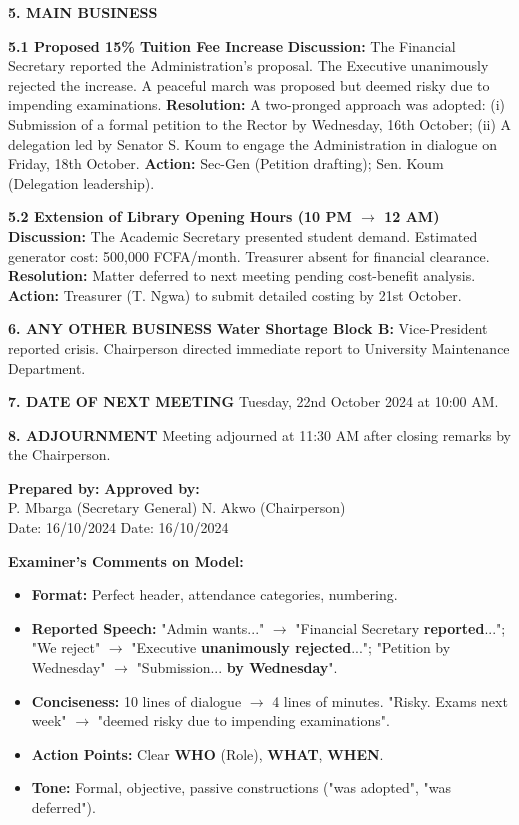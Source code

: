 \documentclass[11pt]{article}
\begin{document}
\begin{exoresolu}
\textbf{5. MAIN BUSINESS}

\textbf{5.1 Proposed 15\% Tuition Fee Increase}
\textbf{Discussion:} The Financial Secretary reported the Administration's proposal. The Executive unanimously rejected the increase. A peaceful march was proposed but deemed risky due to impending examinations.
\textbf{Resolution:} A two-pronged approach was adopted: (i) Submission of a formal petition to the Rector by Wednesday, 16th October; (ii) A delegation led by Senator S. Koum to engage the Administration in dialogue on Friday, 18th October.
\textbf{Action:} Sec-Gen (Petition drafting); Sen. Koum (Delegation leadership).

\textbf{5.2 Extension of Library Opening Hours (10 PM $\rightarrow$ 12 AM)}
\textbf{Discussion:} The Academic Secretary presented student demand. Estimated generator cost: 500,000 FCFA/month. Treasurer absent for financial clearance.
\textbf{Resolution:} Matter deferred to next meeting pending cost-benefit analysis.
\textbf{Action:} Treasurer (T. Ngwa) to submit detailed costing by 21st October.

\textbf{6. ANY OTHER BUSINESS}
\textbf{Water Shortage Block B:} Vice-President reported crisis. Chairperson directed immediate report to University Maintenance Department.

\textbf{7. DATE OF NEXT MEETING}
Tuesday, 22nd October 2024 at 10:00 AM.

\textbf{8. ADJOURNMENT}
Meeting adjourned at 11:30 AM after closing remarks by the Chairperson.

\vspace{0.5cm}
\textbf{Prepared by:} \underline{\hspace{5cm}} \hfill \textbf{Approved by:} \underline{\hspace{5cm}}\\
P. Mbarga (Secretary General) \hfill N. Akwo (Chairperson)\\
Date: 16/10/2024 \hfill Date: 16/10/2024

\vspace{0.5cm}
\textbf{Examiner's Comments on Model:}
\begin{itemize}
    \item \textbf{Format:} Perfect header, attendance categories, numbering.
    \item \textbf{Reported Speech:} "Admin wants..." $\rightarrow$ "Financial Secretary \textbf{reported}..."; "We reject" $\rightarrow$ "Executive \textbf{unanimously rejected}..."; "Petition by Wednesday" $\rightarrow$ "Submission... \textbf{by Wednesday}".
    \item \textbf{Conciseness:} 10 lines of dialogue $\rightarrow$ 4 lines of minutes. "Risky. Exams next week" $\rightarrow$ "deemed risky due to impending examinations".
    \item \textbf{Action Points:} Clear \textbf{WHO} (Role), \textbf{WHAT}, \textbf{WHEN}.
    \item \textbf{Tone:} Formal, objective, passive constructions ("was adopted", "was deferred").
\end{itemize}
\end{exoresolu}
\end{document}
